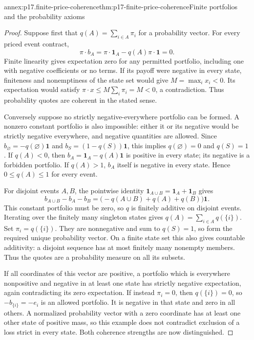 \begin{annexitem}{annex:p17.finite-price-coherence}{thm:p17-finite-price-coherence}{Finite portfolios and the probability axioms}
\begin{proof}
Suppose first that \(q(A)=\sum_{i\in A}\pi_i\) for a probability
vector. For every priced event contract,
\[
               \pi\cdot b_A=\pi\cdot\mathbf1_A
                                  -q(A)\pi\cdot\mathbf1=0.
\]
Finite linearity gives expectation zero for any permitted portfolio,
including one with negative coefficients or no terms. If its payoff
were negative in every state, finiteness and nonemptiness of the state
set would give \(M=\max_i x_i<0\). Its expectation would satisfy
\(\pi\cdot x\leq M\sum_i\pi_i=M<0\), a contradiction.
Thus probability quotes are coherent in the stated sense.

Conversely suppose no strictly negative-everywhere portfolio can be
formed. A nonzero constant portfolio is also impossible: either it
or its negative would be strictly negative everywhere, and negative
quantities are allowed. Since
\(b_\varnothing=-q(\varnothing)\mathbf1\) and
\(b_S=(1-q(S))\mathbf1\), this implies
\(q(\varnothing)=0\) and \(q(S)=1\).
If \(q(A)<0\), then \(b_A=\mathbf1_A-q(A)\mathbf1\) is positive
in every state; its negative is a forbidden portfolio. If \(q(A)>1\),
\(b_A\) itself is negative in every state. Hence
\(0\leq q(A)\leq1\) for every event.

For disjoint events \(A,B\), the pointwise identity
\(\mathbf1_{A\cup B}=\mathbf1_A+\mathbf1_B\) gives
\[
              b_{A\cup B}-b_A-b_B
                   =\bigl(-q(A\cup B)+q(A)+q(B)\bigr)\mathbf1.
\]
This constant portfolio must be zero, so \(q\) is finitely additive
on disjoint events. Iterating over the finitely many singleton states
gives
\(q(A)=\sum_{i\in A}q(\{i\})\).
Set \(\pi_i=q(\{i\})\). They are nonnegative and sum to
\(q(S)=1\), so form the required unique probability vector. On a
finite state set this also gives countable additivity: a disjoint
sequence has at most finitely many nonempty members. Thus the quotes
are a probability measure on all its subsets.

If all coordinates of this vector are positive, a portfolio which
is everywhere nonpositive and negative in at least one state has
strictly negative expectation, again contradicting its zero expectation.
If instead \(\pi_i=0\), then \(q(\{i\})=0\), so
\(-b_{\{i\}}=-e_i\) is an allowed portfolio. It is negative in
that state and zero in all others. A normalized probability vector
with a zero coordinate has at least one other state of positive
mass, so this example does not contradict exclusion of a loss
strict in every state. Both coherence strengths are now distinguished.
\end{proof}
\end{annexitem}


